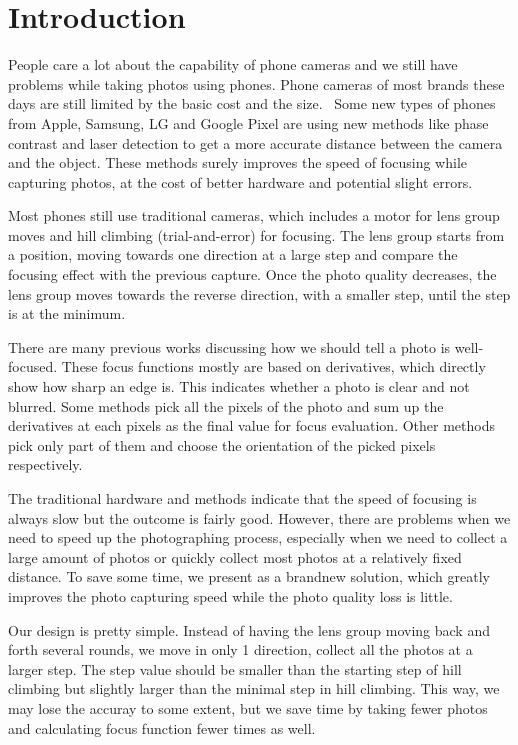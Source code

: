 \vspace{-1em}
\section{Introduction}

People care a lot about the capability of phone cameras and we still have problems while taking photos using phones.
Phone cameras of most brands these days are still limited by the basic cost and the size.~\cite{autofocus}
Some new types of phones from Apple, Samsung, LG and Google Pixel are using new methods like phase contrast and laser detection to get a more accurate distance between the camera and the object.
These methods surely improves the speed of focusing while capturing photos, at the cost of better hardware and potential slight errors.

Most phones still use traditional cameras, which includes a motor for lens group moves and hill climbing (trial-and-error) for focusing.
The lens group starts from a position, moving towards one direction at a large step and compare the focusing effect with the previous capture.
Once the photo quality decreases, the lens group moves towards the reverse direction, with a smaller step, until the step is at the minimum.

There are many previous works discussing how we should tell a photo is well-focused.
These focus functions mostly are based on derivatives, which directly show how sharp an edge is.
This indicates whether a photo is clear and not blurred.
Some methods pick all the pixels of the photo and sum up the derivatives at each pixels as the final value for focus evaluation.
Other methods pick only part of them and choose the orientation of the picked pixels respectively.

The traditional hardware and methods indicate that the speed of focusing is always slow but the outcome is fairly good.
However, there are problems when we need to speed up the photographing process, especially when we need to collect a large amount of photos or quickly collect most photos at a relatively fixed distance.
To save some time, we present \sysname as a brandnew solution, which greatly improves the photo capturing speed while the photo quality loss is little.

Our design is pretty simple.
Instead of having the lens group moving back and forth several rounds, we move in only 1 direction, collect all the photos at a larger step.
The step value should be smaller than the starting step of hill climbing but slightly larger than the minimal step in hill climbing.
This way, we may lose the accuray to some extent, but we save time by taking fewer photos and calculating focus function fewer times as well.

